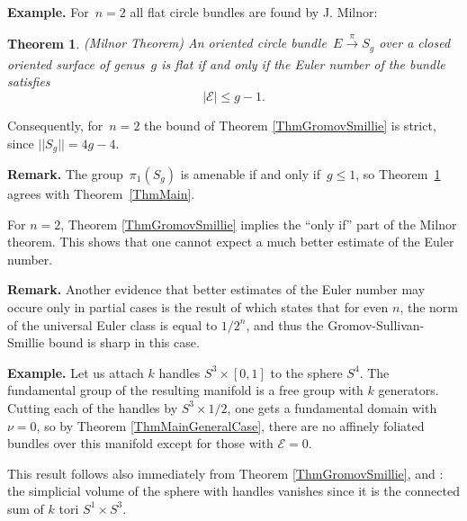 \documentclass[12pt]{amsart}
\theoremstyle{plain}
\newtheorem{theorem}{Theorem}
\theoremstyle{definition}
\theoremstyle{plain}
\theoremstyle{definition}
\renewcommand{\leq}{\leqslant}
\begin{document}
\textbf{Example.} For~$n=2$ all flat circle bundles are found by J. Milnor:

\begin{theorem}(Milnor Theorem)\label{MW}\cite{Milnor, MilnorIneq}
An oriented circle bundle~$E\xrightarrow[\text{}]{\pi} S_g$ over a closed oriented surface of genus~$g$ 
is flat if and only if the Euler number of the bundle satisfies 
$$|\mathcal{E}|\leq g-1.$$
\end{theorem}
Consequently,  for~$n=2$ the bound of Theorem \ref{ThmGromovSmillie} is strict, since $||S_g||=4g-4.$
\medskip

\textbf{Remark.} The group~$\pi_1(S_g)$ is amenable if and only {if~$g\leq 1$}, so Theorem~\ref{MW} agrees with Theorem~\ref{ThmMain}.

  For $n=2$, Theorem \ref{ThmGromovSmillie} implies the ``only if'' part of the Milnor theorem.   This shows that one cannot expect a much better estimate of the Euler number.

\medskip

\textbf{Remark.} Another evidence that better estimates of the Euler number may occure only in partial cases is the result of \cite{BucherMonod} which states that  for even $n$, the norm of the universal Euler class is equal to $1/2^n$, and thus the Gromov-Sullivan-Smillie bound is sharp in this case.


\bigskip

\textbf{Example.}
  Let us attach $k$ handles $S^3\times [0,1]$ to the sphere $S^4$. The fundamental group of the resulting manifold is a free group with $k$ generators.
  Cutting each of the handles by $S^3\times {1/2}$, one gets a fundamental domain with $\nu=0$, so by Theorem
  \ref{ThmMainGeneralCase}, there are no affinely foliated bundles over this manifold except for those with $\mathcal{E}=0$.
  
  This result follows also  immediately from {Theorem \ref{ThmGromovSmillie}, } and \cite{Gromov}: the simplicial volume of the sphere with handles vanishes since it is the connected sum of $k$ tori $S^1\times S^3$.

\medskip
\end{document}
